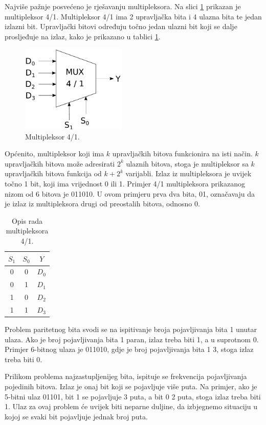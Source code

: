 \documentclass[times, utf8, zavrsni]{fer}
\begin{document}
Najviše pažnje posvećeno je rješavanju multipleksora.
Na slici \ref{img:mux} prikazan je multipleksor 4/1.
Multipleksor 4/1 ima 2 upravljačka bita i 4 ulazna bita te jedan izlazni bit.
Upravljački bitovi određuju točno jedan ulazni bit koji se dalje prosljeđuje na izlaz, kako je prikazano u tablici \ref{tbl:mux}.
\begin{figure}[h]
    \centering
    \includegraphics[width=5cm]{img/mux.pdf}
    \caption{Multipleksor 4/1.}
    \label{img:mux}
\end{figure}
Općenito, multipleksor koji ima $k$ upravljačkih bitova funkcionira na isti način.
$k$ upravljačkih bitova može adresirati $2^{k}$ ulaznih bitova, stoga je multipleksor sa $k$ upravljačkih bitova funkcija od $k + 2^{k}$ varijabli.
Izlaz iz multipleksora je uvijek točno 1 bit, koji ima vrijednost 0 ili 1.
Primjer 4/1 multipleksora prikazanog nizom od 6 bitova je 011010.
U ovom primjeru prva dva bita, 01, označavaju da je izlaz iz multipleksora drugi od preostalih bitova, odnosno 0.
\begin{table}[!htb]
    \caption{Opis rada multipleksora 4/1.}
    \label{tbl:mux}
    \centering
    \begin{tabular}{c | c | c}
        $S_{1}$ & $S_{0}$ & $Y$     \\ \hline
              0 &       0 & $D_{0}$ \\
              0 &       1 & $D_{1}$ \\
              1 &       0 & $D_{2}$ \\
              1 &       1 & $D_{3}$ \\
    \end{tabular}
\end{table}

Problem paritetnog bita svodi se na ispitivanje broja pojavljivanja bita 1 unutar ulaza.
Ako je broj pojavljivanja bita 1 paran, izlaz treba biti 1, a u suprotnom 0.
Primjer 6-bitnog ulaza je 011010, gdje je broj pojavljivanja bita 1 3, stoga izlaz treba biti 0.

Prilikom problema najzastupljenijeg bita, ispituje se frekvencija pojavljivanja pojedinih bitova.
Izlaz je onaj bit koji se pojavljuje više puta.
Na primjer, ako je 5-bitni ulaz 01101, bit 1 se pojavljuje 3 puta, a bit 0 2 puta, stoga izlaz treba biti 1.
Ulaz za ovaj problem će uvijek biti neparne duljine, da izbjegnemo situaciju u kojoj se svaki bit pojavljuje jednak broj puta.
\end{document}
